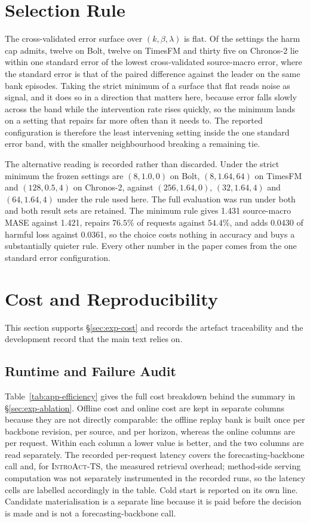 \documentclass{article}
\newcommand{\introact}{\textsc{IntroAct-TS}}
\begin{document}
\section{Selection Rule}
\label{app:selection-rule}

The cross-validated error surface over $(k,\beta,\lambda)$ is flat. Of the settings the harm
cap admits, twelve on Bolt, twelve on TimesFM and thirty five on Chronos-2 lie within one
standard error of the lowest cross-validated source-macro error, where the standard error is
that of the paired difference against the leader on the same bank episodes. Taking the strict
minimum of a surface that flat reads noise as signal, and it does so in a direction that
matters here, because error falls slowly across the band while the intervention rate rises
quickly, so the minimum lands on a setting that repairs far more often than it needs to. The
reported configuration is therefore the least intervening setting inside the one standard
error band, with the smaller neighbourhood breaking a remaining tie.

The alternative reading is recorded rather than discarded. Under the strict minimum the frozen
settings are $(8, 1.0, 0)$ on Bolt, $(8, 1.64, 64)$ on TimesFM and $(128, 0.5, 4)$ on
Chronos-2, against $(256, 1.64, 0)$, $(32, 1.64, 4)$ and $(64, 1.64, 4)$ under the rule used
here. The full evaluation was run under both and both result sets are retained. The minimum
rule gives 1.431 source-macro MASE against 1.421, repairs $76.5\%$ of requests against
$54.4\%$, and adds 0.0430 of harmful loss against 0.0361, so the choice costs nothing in
accuracy and buys a substantially quieter rule. Every other number in the paper comes from the
one standard error configuration.

\section{Cost and Reproducibility}

This section supports \S\ref{sec:exp-cost} and records the artefact traceability and the
development record that the main text relies on.

\subsection{Runtime and Failure Audit}
\label{app:calls}
Table~\ref{tab:app-efficiency} gives the full cost breakdown behind the summary in
\S\ref{sec:exp-ablation}. Offline cost and online cost are kept in separate columns because
they are not directly comparable: the offline replay bank is built once per backbone revision,
per source, and per horizon, whereas the online columns are per request. Within each column a
lower value is better, and the two columns are read separately. The recorded per-request
latency covers the forecasting-backbone call and, for \introact{}, the measured retrieval
overhead; method-side serving computation was not separately instrumented in the recorded
runs, so the latency cells are labelled accordingly in the table. Cold start is
reported on its own line. Candidate materialisation is a separate line because it is paid
before the decision is made and is not a forecasting-backbone call.
\end{document}
